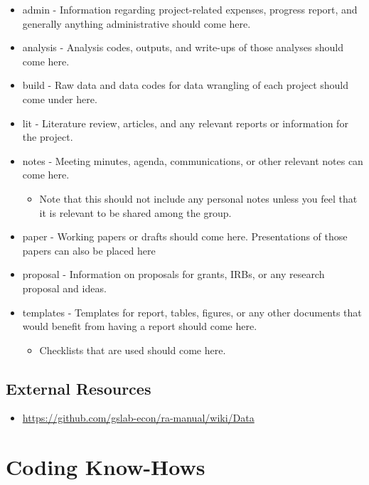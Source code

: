 \documentclass[
]{book}
\providecommand{\tightlist}{%
  \setlength{\itemsep}{0pt}\setlength{\parskip}{0pt}}
\begin{document}
\begin{itemize}
\item
  admin - Information regarding project-related expenses, progress report, and generally anything administrative should come here.
\item
  analysis - Analysis codes, outputs, and write-ups of those analyses should come here.
\item
  build - Raw data and data codes for data wrangling of each project should come under here.
\item
  lit - Literature review, articles, and any relevant reports or information for the project.
\item
  notes - Meeting minutes, agenda, communications, or other relevant notes can come here.

  \begin{itemize}
  \tightlist
  \item
    Note that this should not include any personal notes unless you feel that it is relevant to be shared among the group.
  \end{itemize}
\item
  paper - Working papers or drafts should come here. Presentations of those papers can also be placed here
\item
  proposal - Information on proposals for grants, IRBs, or any research proposal and ideas.
\item
  templates - Templates for report, tables, figures, or any other documents that would benefit from having a report should come here.

  \begin{itemize}
  \tightlist
  \item
    Checklists that are used should come here.
  \end{itemize}
\end{itemize}

\hypertarget{external-resources-4}{%
\section{External Resources}\label{external-resources-4}}

\begin{itemize}
\tightlist
\item
  \url{https://github.com/gslab-econ/ra-manual/wiki/Data}
\end{itemize}

\hypertarget{coding-know-hows}{%
\chapter{\texorpdfstring{\textbf{Coding Know-Hows}}{Coding Know-Hows}}\label{coding-know-hows}}
\end{document}
